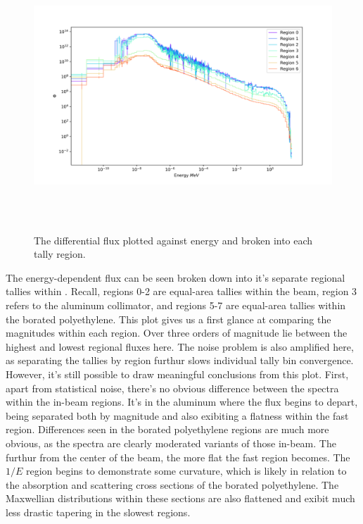 %
\begin{figure}[htb]
\centering
\includegraphics[height=4in]{tex/figures/flux_rad_erg.png}
\caption[Radial Flux vs. Energy]{The differential flux plotted against energy and broken into each tally region.}
\label{fig:flux_rad_erg}
\end{figure}

The energy-dependent flux can be seen broken down into it's separate regional tallies within .
Recall, regions 0-2 are equal-area tallies within the beam, region 3 refers to the aluminum collimator, and regions 5-7 are equal-area tallies within the borated polyethylene.
This plot gives us a first glance at comparing the magnitudes within each region.
Over three orders of magnitude lie between the highest and lowest regional fluxes here.
The noise problem  is also amplified here, as separating the tallies by region furthur slows individual tally bin convergence.
However, it's still possible to draw meaningful conclusions from this plot.
First, apart from statistical noise, there's no obvious difference between the spectra within the in-beam regions.
It's in the aluminum where the flux begins to depart, being separated both by magnitude and also exibiting a flatness within the fast region.
Differences seen in the borated polyethylene regions are much more obvious, as the spectra are clearly moderated variants of those in-beam.
The furthur from the center of the beam, the more flat the fast region becomes.
The $1/E$ region begins to demonstrate some curvature, which is likely in relation to the absorption and scattering cross sections of the borated polyethylene.
The Maxwellian distributions within these sections are also flattened and exibit much less drastic tapering in the slowest regions.

